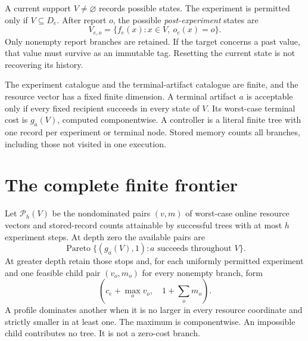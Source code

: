 A current support $V\ne\varnothing$ records possible states. The experiment is permitted only if $V\subseteq D_e$. After report $o$, the possible \emph{post-experiment} states are
\[
V_{e,o}=\{f_e(x):x\in V,\ o_e(x)=o\}.
\]
Only nonempty report branches are retained. If the target concerns a past value, that value must survive as an immutable tag. Resetting the current state is not recovering its history.

The experiment catalogue and the terminal-artifact catalogue are finite, and the resource vector has a fixed finite dimension. A terminal artifact $a$ is acceptable only if every fixed recipient succeeds in every state of $V$. Its worst-case terminal cost is $g_a(V)$, computed componentwise. A controller is a literal finite tree with one record per experiment or terminal node. Stored memory counts all branches, including those not visited in one execution.

\section{The complete finite frontier}
Let $\mathcal P_h(V)$ be the nondominated pairs $(v,m)$ of worst-case online resource vectors and stored-record counts attainable by successful trees with at most $h$ experiment steps. At depth zero the available pairs are
\[
\operatorname{Pareto}\{(g_a(V),1):a\text{ succeeds throughout }V\}.
\]
At greater depth retain those stops and, for each uniformly permitted experiment and one feasible child pair $(v_o,m_o)$ for every nonempty branch, form
\[
\left(c_e+\max_o v_o,\quad1+\sum_o m_o\right).
\]
A profile dominates another when it is no larger in every resource coordinate and strictly smaller in at least one. The maximum is componentwise. An impossible child contributes no tree. It is not a zero-cost branch.


